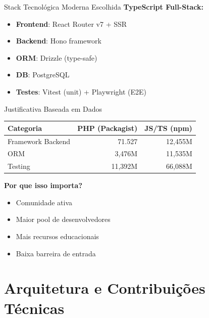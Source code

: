 \documentclass[aspectratio=169,xcolor=table]{beamer}
\begin{document}
\begin{frame}{Stack Tecnológica Moderna Escolhida}
    \textbf{TypeScript Full-Stack:}
    \begin{itemize}
        \item \textbf{Frontend}: React Router v7 + SSR
        \item \textbf{Backend}: Hono framework
        \item \textbf{ORM}: Drizzle (type-safe)
        \item \textbf{DB}: PostgreSQL
        \item \textbf{Testes}: Vitest (unit) + Playwright (E2E)
    \end{itemize}
\end{frame}

\begin{frame}{Justificativa Baseada em Dados}
    \begin{table}[h]
        \centering
        \small
        \begin{tabular}{l r r}
            \toprule
            Categoria & PHP (Packagist) & JS/TS (npm) \\
            \midrule
            Framework Backend & 71.527 & 12,455M \\
            ORM & 3,476M & 11,535M \\
            Testing & 11,392M & 66,088M \\
            \bottomrule
        \end{tabular}
    \end{table}
    
    \vspace{0.5em}
    \textbf{Por que isso importa?}
    \begin{itemize}
        \item  Comunidade ativa
        \item  Maior pool de desenvolvedores
        \item  Mais recursos educacionais
        \item  Baixa barreira de entrada
    \end{itemize}
    
\end{frame}

\section{Arquitetura e Contribuições Técnicas}
\end{document}
